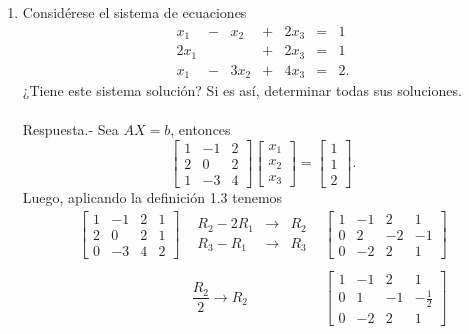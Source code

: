 \begin{enumerate}[\bfseries 1.]
    \item Considérese el sistema de ecuaciones
	$$\begin{array}{ccccccl}
	    x_1&-&x_2&+&2x_3&=&1\\
	    2x_1&&&+&2x_3&=&1\\
	    x_1&-&3x_2&+&4x_3&=&2.
	\end{array}$$
	¿Tiene este sistema solución? Si es así, determinar todas sus soluciones.\\\\
	Respuesta.-\; Sea $AX=b$, entonces
	$$
	\left[\begin{array}{*{3}{r}}
	    1 & -1 & 2 \\
	    2 & 0 & 2 \\
	    1 & -3 & 4
	\end{array}\right]
	\left[\begin{array}{c}
	    x_1 \\
	    x_2 \\
	    x_3
	\end{array}\right] = 
	\left[\begin{array}{c}
	    1 \\
	    1 \\
	    2
	\end{array}\right].
	$$
	Luego, aplicando la definición 1.3 tenemos 
	$$
	\begin{array}{rcl}
	\left[\begin{array}{rrr|r}
	    1 & -1 & 2 & 1 \\
	    2 & 0 & 2 & 1 \\
	    0 & -3 & 4 & 2 
	\end{array}\right] 
	&
	\begin{array}{rcl}
	    R_2-2R_1 &\to& R_2 \\
	    R_3-R_1 &\to& R_3
	\end{array}
	&
	\left[\begin{array}{rrr|r}
	    1 & -1 & 2 & 1 \\
	    0 & 2 & -2 & -1 \\
	    0 & -2 & 2 & 1 
	\end{array}\right]\\\\
	&
	\dfrac{R_2}{2} \to R_2
	&
	\left[\begin{array}{rrr|r}
	    1 & -1 & 2 & 1 \\
	    0 & 1 & -1 & -\frac{1}{2} \\
	    0 & -2 & 2 & 1
	\end{array}\right]\\\\

\end{array}$$
\end{enumerate}
